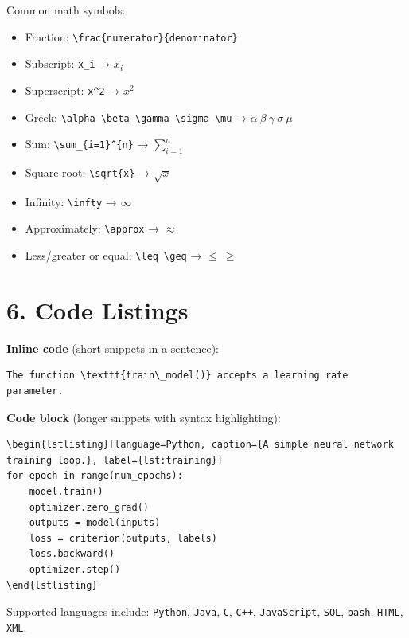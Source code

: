 \noindent
Common math symbols:
\begin{itemize}
    \item Fraction: \verb|\frac{numerator}{denominator}|
    \item Subscript: \verb|x_i| → $x_i$
    \item Superscript: \verb|x^2| → $x^2$
    \item Greek: \verb|\alpha \beta \gamma \sigma \mu| → $\alpha\ \beta\ \gamma\ \sigma\ \mu$
    \item Sum: \verb|\sum_{i=1}^{n}| → $\sum_{i=1}^{n}$
    \item Square root: \verb|\sqrt{x}| → $\sqrt{x}$
    \item Infinity: \verb|\infty| → $\infty$
    \item Approximately: \verb|\approx| → $\approx$
    \item Less/greater or equal: \verb|\leq \geq| → $\leq\ \geq$
\end{itemize}


\section*{6. Code Listings}

\noindent
\textbf{Inline code} (short snippets in a sentence):

\begin{verbatim}
The function \texttt{train\_model()} accepts a learning rate parameter.
\end{verbatim}

\noindent
\textbf{Code block} (longer snippets with syntax highlighting):

\begin{verbatim}
\begin{lstlisting}[language=Python, caption={A simple neural network
training loop.}, label={lst:training}]
for epoch in range(num_epochs):
    model.train()
    optimizer.zero_grad()
    outputs = model(inputs)
    loss = criterion(outputs, labels)
    loss.backward()
    optimizer.step()
\end{lstlisting}
\end{verbatim}

\noindent
Supported languages include: \texttt{Python}, \texttt{Java},
\texttt{C}, \texttt{C++}, \texttt{JavaScript}, \texttt{SQL},
\texttt{bash}, \texttt{HTML}, \texttt{XML}.

